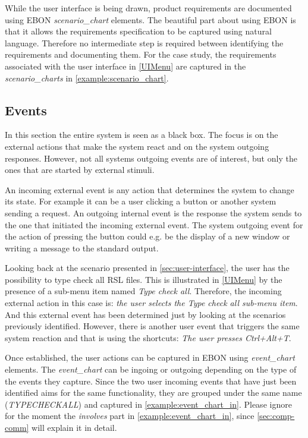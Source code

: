 \documentclass[conference]{IEEEtran}
\begin{document}
While the user interface is being drawn, product requirements are
documented using EBON \emph{scenario\_chart} elements. The beautiful
part about using EBON is that it allows the requirements specification
to be captured using natural language. Therefore no intermediate step
is required between identifying the requirements and documenting them.
For the case study, the requirements associated with the user
interface in \autoref{UIMenu} are captured in the
\emph{scenario\_charts} in \autoref{example:scenario_chart}.

%
\subsection{Events}
\label{sec:events}

In this section the entire system is seen as a black box. The focus is
on the external actions that make the system react and on the system
outgoing responses. However, not all systems outgoing events are of
interest, but only the ones that are started by external stimuli. 

An incoming external event is any action that determines the system to
change its state. For example it can be a user clicking a button or
another system sending a request. An outgoing internal event is the
response the system sends to the one that initiated the incoming
external event. The system outgoing event for the action of pressing
the button could e.g. be the display of a new window or writing a
message to the standard output.

Looking back at the scenario presented in
\autoref{sec:user-interface}, the user has the possibility to type
check all RSL files. This is illustrated in \autoref{UIMenu} by the
presence of a sub-menu item named \emph{Type check all}. Therefore,
the incoming external action in this case is: \emph{the user selects
the Type check all sub-menu item}. And this external event has been
determined just by looking at the scenarios previously identified.
However, there is another user event that triggers the same system
reaction and that is using the shortcuts: \emph{The user presses
Ctrl+Alt+T}.



Once established, the user actions can be captured in EBON using
\emph{event\_chart} elements. The \emph{event\_chart} can be ingoing
or outgoing depending on the type of the events they capture. Since
the two user incoming events that have just been identified aims for
the same functionality, they are grouped under the same name
(\emph{TYPECHECKALL}) and captured in
\autoref{example:event_chart_in}. Please ignore for the moment the
\emph{involves} part in \autoref{example:event_chart_in}, since
\autoref{sec:comp-comm} will explain it in detail.
\end{document}

